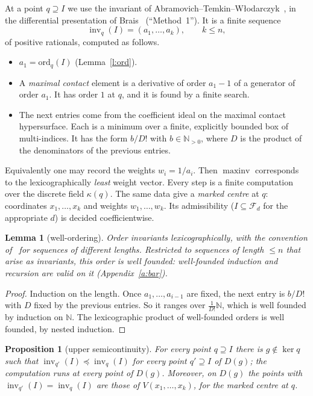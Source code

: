 \documentclass[11pt]{article}
\newcommand{\N}{\mathbb{N}}
\newcommand{\cF}{\mathcal{F}}
\newcommand{\inv}{\operatorname{inv}}
\newcommand{\maxinv}{\operatorname{maxinv}}
\numberwithin{equation}{section}
\theoremstyle{plain}
\newtheorem{proposition}[theorem]{Proposition}
\newtheorem{lemma}[theorem]{Lemma}
\theoremstyle{definition}
\theoremstyle{remark}
\begin{document}
At a point $q\supseteq I$ we use the invariant of Abramovich--Temkin--Włodarczyk~\cite{ATW}, in the
differential presentation of Brais~\cite{Brais} (``Method~1''). It is a finite sequence
\[
\inv_q(I)=(a_1,\dots,a_k),\qquad k\le n,
\]
of positive rationals, computed as follows.
\begin{itemize}
\item $a_1=\mathrm{ord}_q(I)$ (Lemma~\ref{l:ord}).
\item A \emph{maximal contact} element is a derivative of order $a_1-1$ of a generator of order
  $a_1$. It has order $1$ at $q$, and it is found by a finite search.
\item The next entries come from the coefficient ideal on the maximal contact hypersurface. Each
  is a minimum over a finite, explicitly bounded box of multi-indices. It has the form $b/D!$ with
  $b\in\N_{>0}$, where $D$ is the product of the denominators of the previous entries.
\end{itemize}
Equivalently one may record the weights $w_i=1/a_i$. Then $\maxinv$ corresponds to the
lexicographically \emph{least} weight vector.
Every step is a finite computation over the discrete field $\kappa(q)$. The same data give a
\emph{marked centre} at $q$: coordinates $x_1,\dots,x_k$ and weights $w_1,\dots,w_k$. Its
admissibility ($I\subseteq\cF_{d}$ for the appropriate $d$) is decided coefficientwise.

\begin{lemma}[well-ordering]\label{l:wo}
Order invariants lexicographically, with the convention of~\cite{ATW} for sequences of different
lengths. Restricted to sequences of length $\le n$ that arise as invariants, this order is well
founded: well-founded induction and recursion are valid on it
(Appendix~\ref{a:bar}).
\end{lemma}

\begin{proof}
Induction on the length. Once $a_1,\dots,a_{i-1}$ are fixed, the next entry is $b/D!$ with $D$
fixed by the previous entries. So it ranges over $\frac1{D!}\N$, which is well founded by induction
on $\N$. The lexicographic product of well-founded orders
is well founded, by nested induction.
\end{proof}

\begin{proposition}[upper semicontinuity]\label{p:usc}
For every point $q\supseteq I$ there is $g\notin\ker q$ such that $\inv_{q'}(I)\preceq\inv_q(I)$
for every point $q'\supseteq I$ of $D(g)$; the computation runs at every point of $D(g)$.
Moreover, on $D(g)$ the points with
$\inv_{q'}(I)=\inv_q(I)$ are those of $V(x_1,\dots,x_k)$, for the marked centre at $q$.
\end{proposition}
\end{document}
